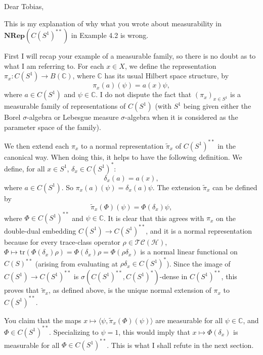 \documentclass{article}
\title{}
\author{}
\newcommand{\TC}{\ensuremath{\mathcal{TC}}}
\newcommand{\NRep}{\cat{NRep}}
\newcommand{\tr}{\ensuremath{\mathrm{tr}}}
\newcommand{\C}{\ensuremath{\mathbb{C}}}
\newcommand{\cat}[1]{\ensuremath{\mathbf{#1}}}
\newcommand{\Hil}{\ensuremath{\mathcal{H}}}
\begin{document}
\maketitle

Dear Tobias,

This is my explanation of why what you wrote about measurability in $\NRep(C(S^1)^{**})$ in Example 4.2 is wrong. 

First I will recap your example of a measurable family, so there is no doubt as to what I am referring to. For each $x \in X$, we define the representation $\pi_x : C(S^1) \rightarrow B(\C)$, where $\C$ has its usual Hilbert space structure, by
\[
\pi_x(a)(\psi) = a(x)\psi,
\]
where $a \in C(S^1)$ and $\psi \in \C$. I do not dispute the fact that $(\pi_x)_{x \in S^1}$ is a measurable family of representations of $C(S^1)$ (with $S^1$ being given either the Borel $\sigma$-algebra or Lebesgue measure $\sigma$-algebra when it is considered as the parameter space of the family). 

We then extend each $\pi_x$ to a normal representation $\tilde{\pi}_x$ of $C(S^1)^{**}$ in the canonical way. When doing this, it helps to have the following definition. We define, for all $x \in S^1$, $\delta_x \in C(S^1)^*$:
\[
\delta_x(a) = a(x),
\]
where $a \in C(S^1)$. So $\pi_x(a)(\psi) = \delta_x(a)\psi$. The extension $\tilde{\pi}_x$ can be defined by
\[
\tilde{\pi}_x(\Phi)(\psi) = \Phi(\delta_x)\psi,
\]
where $\Phi \in C(S^1)^{**}$ and $\psi \in \C$. It is clear that this agrees with $\pi_x$ on the double-dual embedding $C(S^1) \rightarrow C(S^1)^{**}$, and it is a normal representation because for every trace-class operator $\rho \in \TC(\Hil)$, $\Phi \mapsto \tr(\Phi(\delta_x)\rho) = \Phi(\delta_x)\rho = \Phi(\rho\delta_x)$ is a normal linear functional on $C(S)^{**}$ (arising from evaluating at $\rho\delta_x \in C(S^1)^*$). Since the image of $C(S^1) \rightarrow C(S^1)^{**}$ is $\sigma(C(S^1)^{**},C(S^1)^*)$-dense in $C(S^1)^{**}$, this proves that $\tilde{\pi}_x$, as defined above, is the unique normal extension of $\pi_x$ to $C(S^1)^{**}$. 

You claim that the maps $x \mapsto \langle \psi, \tilde{\pi}_x(\Phi)(\psi) \rangle$ are measurable for all $\psi \in \C$, and $\Phi \in C(S^1)^{**}$. Specializing to $\psi = 1$, this would imply that $x \mapsto \Phi(\delta_x)$ is measurable for all $\Phi \in C(S^1)^{**}$. This is what I shall refute in the next section. 
\end{document}

